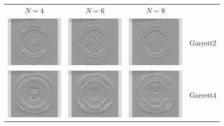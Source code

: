 \documentclass{article}
\begin{document}
\begin{figure}
\begin{center}
\begin{tabular}{cccl}
$N=4$ & $N=6$ & $N=8$ & \\
\includegraphics[width=1.5in]{../graphics/wedge1/garret2_width4_dxhi.jpg} &
\includegraphics[width=1.5in]{../graphics/wedge1/garret2_width6_dxhi.jpg} &
\includegraphics[width=1.5in]{../graphics/wedge1/garret2_width8_dxhi.jpg} &  Garrett2\\
\includegraphics[width=1.5in]{../graphics/wedge1/garret4_width4_dxhi.jpg} &
\includegraphics[width=1.5in]{../graphics/wedge1/garret4_width6_dxhi.jpg} &
\includegraphics[width=1.5in]{../graphics/wedge1/garret4_width8_dxhi.jpg} &  Garrett4\\

\end{tabular}
\end{center}
\end{figure}
\end{document}
